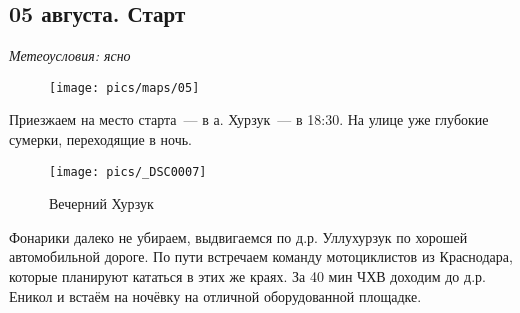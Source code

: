 \subsection{05 августа. Старт}
\textit{Метеоусловия: ясно}

\begin{figure}[h!]
	\centering
	\texttt{[image: pics/maps/05]}
	\label{fig:05}
\end{figure}

Приезжаем на место старта~--- в а. Хурзук~--- в 18:30. На улице уже глубокие сумерки, переходящие в ночь.

\begin{figure}[h!]
	\centering
	\texttt{[image: pics/\_DSC0007]}
	\caption{Вечерний Хурзук}
	\label{fig:_DSC0007}
\end{figure}

Фонарики далеко не убираем, выдвигаемся по д.р. Уллухурзук по хорошей автомобильной дороге. По пути встречаем команду мотоциклистов из Краснодара, которые планируют кататься в этих же краях. За 40 мин ЧХВ доходим до д.р. Еникол и встаём на ночёвку на отличной оборудованной площадке.

\clearpage